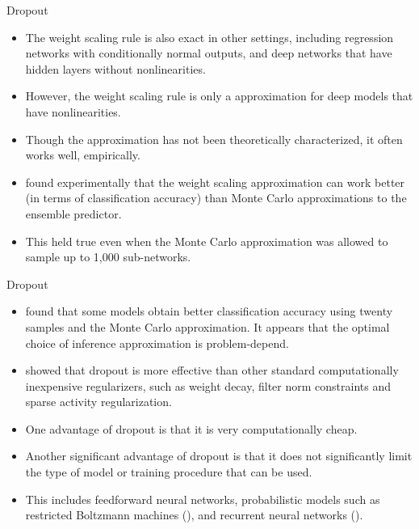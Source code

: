 \documentclass[10pt]{beamer}
\begin{document}
	\begin{frame}{Dropout}
		\begin{itemize}
			\item The weight scaling rule is also exact in other settings, including regression networks with conditionally normal outputs, and deep networks that have hidden layers without nonlinearities.
			\pause
			\item However, the weight scaling rule is only a approximation for deep models that have nonlinearities.
			\pause
			\item Though the approximation has not been theoretically characterized, it often works well, empirically.
			\pause
			\item \citet{goodfellow2013maxout} found experimentally that the weight scaling approximation can work better (in terms of classification accuracy) than Monte Carlo approximations to the ensemble predictor.
			\pause
			\item This held true even when the Monte Carlo approximation was allowed to sample up to 1,000 sub-networks.
		\end{itemize}
	\end{frame}
	
	\begin{frame}{Dropout}
		\begin{itemize}
			\item \citet{gal2015bayesian} found that some models obtain better classification accuracy using twenty samples and the Monte Carlo approximation. It appears that the optimal choice of inference approximation is problem-depend.
			\pause
			\item \citet{srivastava2014dropout} showed that dropout is more effective than other standard computationally inexpensive regularizers, such as weight decay, filter norm constraints and sparse activity regularization.
			\pause
			\item One advantage of dropout is that it is very computationally cheap.
			\pause
			\item Another significant advantage of dropout is that it does not significantly limit the type of model or training procedure that can be used.
			\pause
			\item This includes feedforward neural networks, probabilistic models such as restricted Boltzmann machines (\citet{srivastava2014dropout}), and recurrent neural networks (\citet{bayer2014learning,pascanu2013construct}).
		\end{itemize}
	\end{frame}
	
\end{document}
